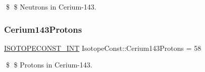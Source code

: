 \$ \$ Neutrons in Cerium-\/143. \mbox{\label{group___isotope_const-_cerium-_ce143_gaa5ac7db14fd3565fffa4298b2c5dc556}} 
\subsubsection{\texorpdfstring{Cerium143\+Protons}{Cerium143Protons}}
{\footnotesize\ttfamily \mbox{\hyperlink{group___isotope_const-_macros_ga5f18360b3e99483a35c32d789e62621c}{I\+S\+O\+T\+O\+P\+E\+C\+O\+N\+S\+T\+\_\+\+I\+NT}} Isotope\+Const\+::\+Cerium143\+Protons = 58}

\$ \$ Protons in Cerium-\/143. 